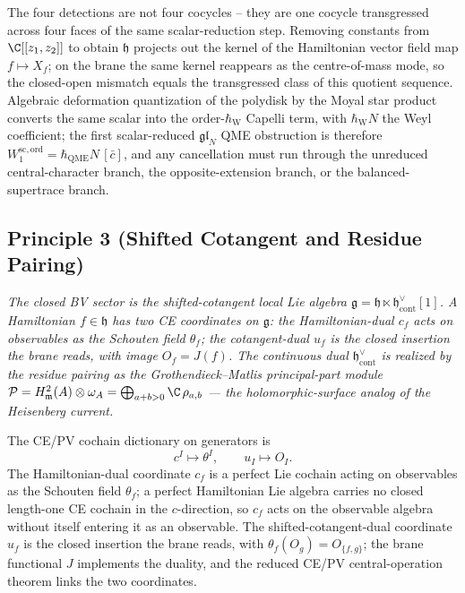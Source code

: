 The four detections are not four cocycles -- they are one cocycle
transgressed across four faces of the same scalar-reduction step.
Removing constants from \(\C[[z_1,z_2]]\) to obtain \(\mathfrak h\)
projects out the kernel of the Hamiltonian vector field map
\(f\mapsto X_f\); on the brane the same kernel reappears as the
centre-of-mass mode, so the closed-open mismatch equals the
transgressed class of this quotient sequence.  Algebraic deformation quantization of the
polydisk by the Moyal star product converts the same scalar into the
order-\(\hbar_{\mathrm{W}}\) Capelli term, with
\(\hbar_{\mathrm{W}}N\) the Weyl coefficient; the first
scalar-reduced \(\mathfrak{gl}_N\) QME obstruction is therefore
\(W_1^{\mathrm{sc,ord}}=\hbar_{\mathrm{QME}}N\,[\bar c]\),
and any cancellation must run through the unreduced central-character
branch, the opposite-extension branch, or the balanced-supertrace
branch.

\subsection*{Principle 3 (Shifted Cotangent and Residue Pairing)}

\emph{The closed BV sector is the shifted-cotangent local Lie algebra
\(\mathfrak g=\mathfrak h\ltimes\mathfrak h^\vee_{\mathrm{cont}}[1]\).
A Hamiltonian \(f\in\mathfrak h\) has two CE coordinates on
\(\mathfrak g\): the Hamiltonian-dual \(c_f\) acts on observables as
the Schouten field \(\theta_f\); the cotangent-dual \(u_f\) is the
closed insertion the brane reads, with image \(O_f=J(f)\).  The
continuous dual \(\mathfrak h^\vee_{\mathrm{cont}}\) is realized by
the residue pairing as the Grothendieck--Matlis principal-part module
\(\mathcal P=H^2_{\mathfrak m}(A)\otimes\omega_A
=\bigoplus_{a+b>0}\C\,\rho_{a,b}\) --- the holomorphic-surface analog
of the Heisenberg current.}

The CE/PV cochain dictionary on generators is
\[
  c^I\longmapsto\theta^I,\qquad u_I\longmapsto O_I .
\]
The Hamiltonian-dual coordinate \(c_f\) is a perfect Lie cochain
acting on observables as the Schouten field \(\theta_f\); a perfect
Hamiltonian Lie algebra carries no closed length-one CE cochain in
the \(c\)-direction, so \(c_f\) acts on the observable algebra
without itself entering it as an observable.  The
shifted-cotangent-dual coordinate \(u_f\) is the closed insertion the
brane reads, with \(\theta_f(O_g)=O_{\{f,g\}}\); the brane functional
\(J\) implements the duality, and the reduced CE/PV
central-operation theorem links the two coordinates.

